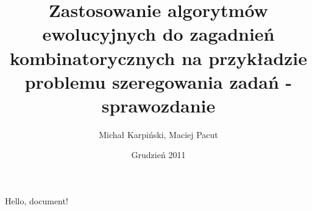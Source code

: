 \documentclass[12pt]{article}
\title{Zastosowanie algorytmów ewolucyjnych do zagadnień
  kombinatorycznych na przykładzie problemu szeregowania zadań - sprawozdanie}
\author{Michał Karpiński, Maciej Pacut}
\date{Grudzień 2011}
\begin{document}
  \maketitle
Hello, document!
\end{document}
